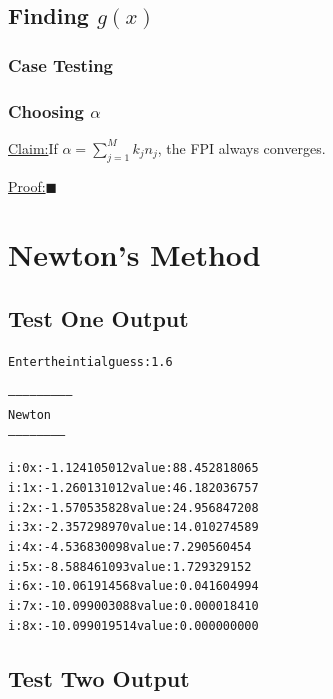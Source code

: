 \documentclass[11pt]{article} %
\newenvironment{claim}[1]{\par\noindent\underline{Claim:}\space#1}{}
\newenvironment{proof}[1]{\par\noindent\underline{Proof:}\space#1}{\hfill $\blacksquare$}
\begin{document}
\subsection*{Finding $g(x)$}

\subsubsection*{Case Testing}

\subsubsection*{Choosing $\alpha$}


\begin{claim}
If $\alpha  = \sum_{j=1}^M k_jn_j$, the FPI always converges.
\end{claim}
\begin{proof}
\end{proof}


\section*{Newton's Method}

\subsection*{Test One Output}
\begin{alltt}
Enter the intial guess: 1.6

--------------------------
 Newton
 -----------------------


i: 0	x: -1.124105012	value: 88.452818065
i: 1	x: -1.260131012	value: 46.182036757
i: 2	x: -1.570535828	value: 24.956847208
i: 3	x: -2.357298970	value: 14.010274589
i: 4	x: -4.536830098	value: 7.290560454
i: 5	x: -8.588461093	value: 1.729329152
i: 6	x: -10.061914568	value: 0.041604994
i: 7	x: -10.099003088	value: 0.000018410
i: 8	x: -10.099019514	value: 0.000000000

\end{alltt}

\subsection*{Test Two Output}
\end{document}
